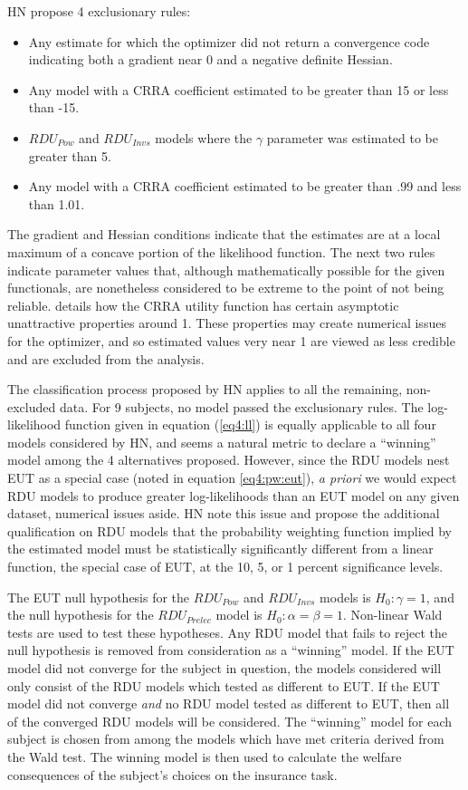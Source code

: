 \documentclass[../main.tex]{subfiles}
\begin{document}
HN propose 4 exclusionary rules:
\begin{itemize}
	\item Any estimate for which the optimizer did not return a convergence code indicating both a gradient near 0 and a negative definite Hessian.
	\item Any model with a CRRA coefficient estimated to be greater than 15 or less than -15.
	\item $\mathit{RDU_{Pow}}$ and $\mathit{RDU_{Invs}}$ models where the $\gamma$ parameter was estimated to be greater than 5.
	\item Any model with a CRRA coefficient estimated to be greater than .99 and less than 1.01.
\end{itemize}

\noindent The gradient and Hessian conditions indicate that the estimates are at a local maximum of a concave portion of the likelihood function.
The next two rules indicate parameter values that, although mathematically possible for the given functionals, are nonetheless considered to be extreme to the point of not being reliable.
\textcite{Wakker2008} details how the CRRA utility function has certain asymptotic unattractive properties around 1.
These properties may create numerical issues for the optimizer, and so estimated values very near 1 are viewed as less credible and are excluded from the analysis.

The classification process proposed by HN applies to all the remaining, non-excluded data.
For 9 subjects, no model passed the exclusionary rules.
The log-likelihood function given in equation (\ref{eq4:ll}) is equally applicable to all four models considered by HN, and seems a natural metric to declare a \enquote{winning} model among the 4 alternatives proposed.
However, since the RDU models nest EUT as a special case (noted in equation \ref{eq4:pw:eut}), \textit{a priori} we would expect RDU models to produce greater log-likelihoods than an EUT model on any given dataset, numerical issues aside.
HN \parencite*[102]{Harrison2016} note this issue and propose the additional qualification on RDU models that the probability weighting function implied by the estimated model must be statistically significantly different from a linear function, the special case of EUT, at the 10, 5, or 1 percent significance levels.

The EUT null hypothesis for the $\mathit{RDU_{Pow}}$ and $\mathit{RDU_{Invs}}$ models is $H_0: \gamma = 1$, and the null hypothesis for the $\mathit{RDU_{Prelec}}$ model is $H_0: \alpha = \beta = 1$.
Non-linear Wald tests are used to test these hypotheses.
Any RDU model that fails to reject the null hypothesis is removed from consideration as a \enquote{winning} model.
If the EUT model did not converge for the subject in question, the models considered will only consist of the RDU models which tested as different to EUT.
If the EUT model did not converge \textit{and} no RDU model tested as different to EUT, then all of the converged RDU models will be considered.
The \enquote{winning} model for each subject is chosen from among the models which have met criteria derived from the Wald test.
The winning model is then used to calculate the welfare consequences of the subject's choices on the insurance task.
\end{document}
